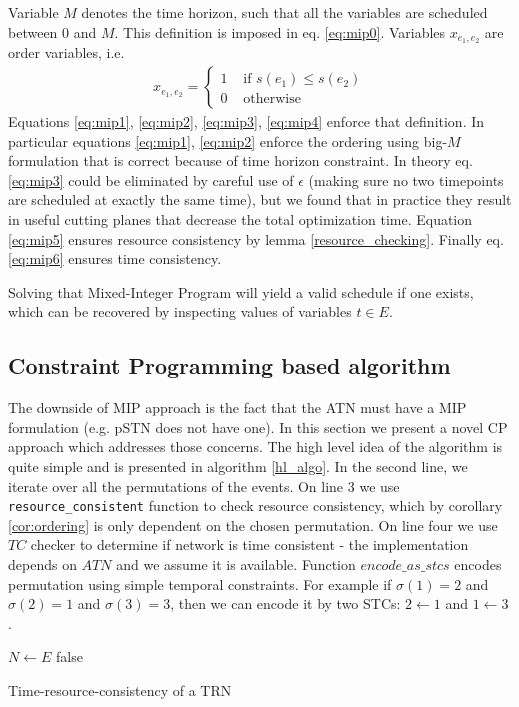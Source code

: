 Variable $M$ denotes the time horizon, such that all the variables are scheduled between $0$ and $M$. This definition is imposed in eq. \ref{eq:mip0}.
Variables $x_{e_1,e_2}$ are order variables, i.e.
\begin{align*}
x_{e_1, e_2} = \begin{cases}
1 &\text{ if }s(e_1) \leq s(e_2) \\
0 &\text{ otherwise}
\end{cases}
\end{align*}
Equations \ref{eq:mip1}, \ref{eq:mip2}, \ref{eq:mip3}, \ref{eq:mip4} enforce that definition. In particular equations \ref{eq:mip1}, \ref{eq:mip2} enforce the ordering using big-$M$ formulation that is correct because of time horizon constraint. In theory eq. \ref{eq:mip3} could be eliminated by careful use of $\epsilon$ (making sure no two timepoints are scheduled at exactly the same time), but we found that in practice they result in useful cutting planes that decrease the total optimization time. Equation \ref{eq:mip5} ensures resource consistency by lemma \ref{resource_checking}. Finally eq. \ref{eq:mip6} ensures time consistency.

Solving that Mixed-Integer Program will yield a valid schedule if one exists, which can be recovered by inspecting values of variables $t \in E$.

\subsection{Constraint Programming based algorithm}
The downside of MIP approach is the fact that the ATN must have a MIP formulation (e.g. pSTN does not have one). In this section we present a novel CP approach which addresses those concerns. The high level idea of the algorithm is quite simple and is presented in algorithm \ref{hl_algo}. In the second line, we iterate over all the permutations of the events. On line 3 we use \texttt{resource\_consistent} function to check resource consistency, which by corollary \ref{cor:ordering} is only dependent on the chosen permutation. On line four we use $TC$ checker to determine if network is time consistent - the implementation depends on $ATN$ and we assume it is available. Function $encode\_as\_stcs$ encodes permutation using simple temporal constraints. For example if $\sigma(1) = 2$ and $\sigma(2) = 1$ and $\sigma(3) = 3$, then we can encode it by two STCs: $ 2 \leftarrow 1 $ and $1 \leftarrow 3$.

\begin{algorithm}[h]
    \label{hl_algo}
    $N \leftarrow E$\;
    \Return false\;
    \caption{Time-resource-consistency of a TRN }
\end{algorithm}

